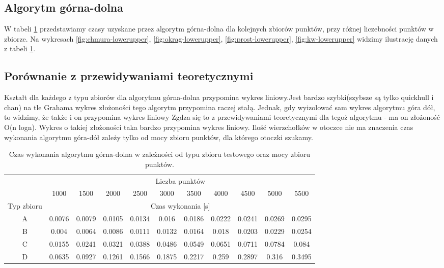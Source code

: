 \documentclass[11pt]{article}
\theoremstyle{remark} \newtheorem{definition}{def.}
\theoremstyle{definition} \newtheorem{twierdzenie}{tw.}
\begin{document}
\subsection{Algorytm górna-dolna}

W tabeli \ref{tab:lowerupper} przedstawiamy czasy uzyskane przez algorytm górna-dolna dla kolejnych zbiorów punktów, przy różnej liczebności punktów w zbiorze. Na wykresach \ref{fig:chmura-lowerupper}, 
\ref{fig:okrag-lowerupper}, \ref{fig:prost-lowerupper}, \ref{fig:kw-lowerupper} widzimy ilustrację danych z tabeli \ref{tab:lowerupper}.

\subsection{Porównanie z przewidywaniami teoretycznymi} 
Kształt dla każdego z typu zbiorów dla algorytmu górna-dolna przypomina wykres liniowy.Jest bardzo szybki(szybsze są tylko quickhull i chan)
na tle Grahama wykres złożoności tego algorytm przypomina raczej stałą. Jednak, gdy wyizolować sam wykres algorytmu góra dół, to widzimy, że także i on przypomina wykres liniowy
Zgdza się to z przewidywaniami teoretycznymi dla tegoż algorytmu - ma on złożoność O(n logn). 
Wykres o takiej złożoności taka bardzo przypomina wykres liniowy. 
Ilość wierzchołków w otoczce nie ma znaczenia czas wykonania algorytmu góra-dół zależy tylko od mocy zbioru punktów, dla którego otoczki szukamy.


\begin{table}[]
\centering
\caption{Czas wykonania algorytmu górna-dolna w zależności od typu zbioru testowego oraz mocy zbioru punktów.}
\label{tab:lowerupper}
\begin{tabular}{c|c|c|c|c|c|c|c|c|c|c|}
\cline{2-11}
\multicolumn{1}{l|}{} & \multicolumn{10}{c|}{Liczba punktów} \\ \cline{2-11} 
\multicolumn{1}{l|}{} & 1000 & 1500 & 2000 & 2500 & 3000 & 3500 & 4000 & 4500 & 5000 & 5500 \\ \hline
\multicolumn{1}{|c|}{Typ zbioru} & \multicolumn{10}{c|}{Czas wykonania [s]} \\ \hline
\multicolumn{1}{|c|}{A} & 0.0076 & 0.0079 & 0.0105 & 0.0134 & 0.016 & 0.0186 & 0.0222 & 0.0241 & 0.0269 & 0.0295 \\ \hline
\multicolumn{1}{|c|}{B} & 0.004 & 0.0064 & 0.0086 & 0.0111 & 0.0132 & 0.0164 & 0.018 & 0.0203 & 0.0229 & 0.0254 \\ \hline
\multicolumn{1}{|c|}{C} & 0.0155 & 0.0241 & 0.0321 & 0.0388 & 0.0486 & 0.0549 & 0.0651 & 0.0711 & 0.0784 & 0.084 \\ \hline
\multicolumn{1}{|c|}{D} & 0.0635 & 0.0927 & 0.1261 & 0.1566 & 0.1875 & 0.2217 & 0.259 & 0.2897 & 0.316 & 0.3495 \\ \hline
\end{tabular}
\end{table}
\end{document}
